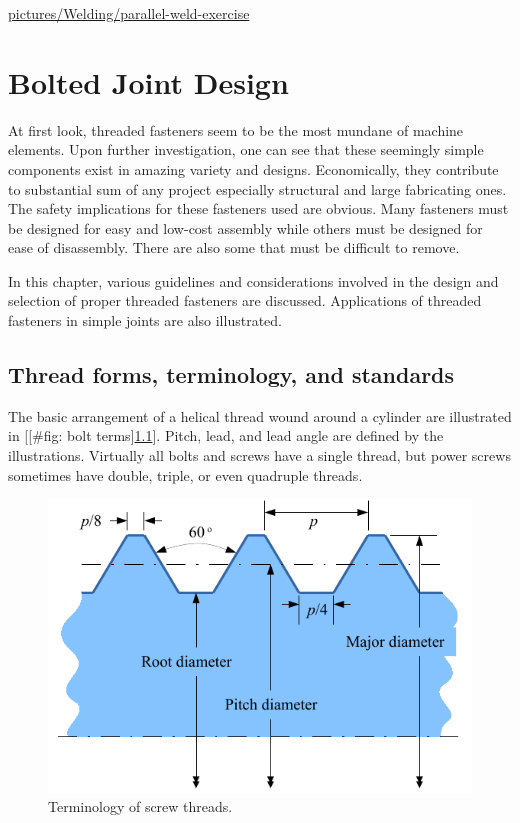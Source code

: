 \documentclass[a4paper,openany,12pt]{book}
\begin{document}
{{\url{pictures/Welding/parallel-weld-exercise}

\chapter{Bolted Joint Design}
\label{sec:org902c973}
At first look, threaded fasteners seem to be the most mundane of machine
elements. Upon further investigation, one can see that these seemingly
simple components exist in amazing variety and designs. Economically,
they contribute to substantial sum of any project especially structural
and large fabricating ones. The safety implications for these fasteners
used are obvious. Many fasteners must be designed for easy and low-cost
assembly while others must be designed for ease of disassembly. There
are also some that must be difficult to remove.

In this chapter, various guidelines and considerations involved in the
design and selection of proper threaded fasteners are discussed.
Applications of threaded fasteners in simple joints are also
illustrated.

\section{Thread forms, terminology, and standards}
\label{sec:orgec5d973}
The basic arrangement of a helical thread wound around a cylinder are
illustrated in [[\#fig: bolt terms]\ref{fig:org85c2c99}]. Pitch, lead, and
lead angle are defined by the illustrations. Virtually all bolts and
screws have a single thread, but power screws sometimes have double,
triple, or even quadruple threads.


\begin{figure}[htbp]
\centering
\includegraphics[width=.9\linewidth]{pictures/Bolt/bolt-terminology.pdf}
\caption{\label{fig:org85c2c99}
Terminology of screw threads.}
\end{figure}

}}
\end{document}
